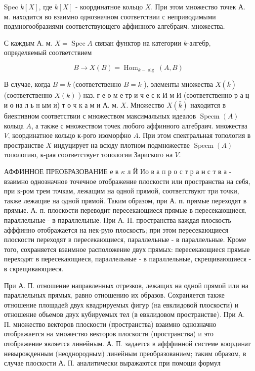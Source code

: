 \documentclass[10pt]{article}
\begin{document}
Spec $k[X]$, где $k[X]$ - координатное кольцо $X$. При этом множество точек А. м. находится во взаимно однозначном соответствии с неприводимыми подмногообразиями соответствующего аффинного алгебраич. множества.



С каждым А. м. $X=\operatorname{Spec} A$ связан функтор на категории $k$-алгебр, определяемый соответствием



\[

B \longrightarrow X(B)=\operatorname{Hom}_{k-\operatorname{alg}}(A, B)

\]



В случае, когда $B=\bar{k}$ (соответственно $B=k$ ), элементы множества $X(\bar{k})$ (соответственно $X(k)$ ) наз. г е о м е тр и ч е с к И м И (соответственно р а ц и о на л ь н ым и) т о ч к а м и А. м. $X$. Множество $X(\bar{k})$ находится в биективном соответствии с множеством максимальных идеалов $\operatorname{Specm}(A)$ кольца $A$, а также с множеством точек любого аффинного алгебраич. множества $V$, координатное кольцо к-рого изоморфно $A$. При этом спектральная топология в пространстве $X$ индуцирует на всюду плотном подмножестве $\operatorname{Specm}(A)$ топологию, к-рая соответствует топологии Зариского на $V$.



АФФИННОЕ ПРЕОБРАЗОВАНИЕ е в $\kappa$ л Й Ио в а п р о с т р а н с т в а - взаимно однозначное точечное отображение плоскости или пространства на себя, при к-ром трем точкам, лежащим на одной прямой, соответствуют три точки, также лежащие на одной прямой. Таким образом, при А. п. прямые переходят в прямые. А. п. плоскости переводит пересекающиеся прямые в пересекающиеся, параллельные - в параллельные. При А. П. пространства каждая плоскость афффинно отображается на нек-рую плоскость; при этом пересекающиеся плоскости переходят в пересекающиеся, параллельные - в параллельные. Кроме того, сохраняется взаимное расположение двух прямых: пересекающиеся прямые переходят в пересекающиеся, параллельные - в параллельные, скрещивающиеся - в скрещивающиеся.



При А. П. отношение направленных отрезков, лежащих на одной прямой или на параллельных прямых, равно отношению их образов. Сохраняется также отношение площадей двух квадрируемых фигур (на евклидовой плоскости) и отношение объемов двух кубируемых тел (в евклидовом пространстве). При А. П. множество векторов плоскости (пространства) взаимно однозначно отображается на множество векторов плоскости (пространства) и это отображение является линейным. А. П. задается в афффинной системе координат невырожденным (неоднородным) линейным преобразованиeм; таким образом, в случае плоскости А. П. аналитически выражаются при помощи формул
\end{document}
